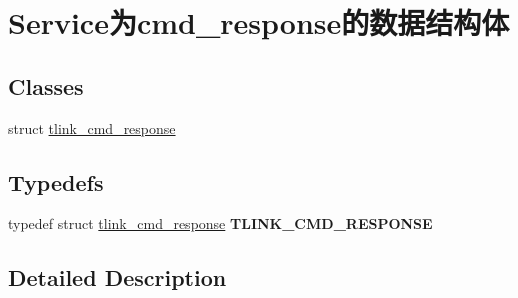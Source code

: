 \hypertarget{group__service_xE4_xB8_xBAcmd__response_xE7_x9A_x84_xE6_x95_xB0_xE6_x8D_xAE_xE7_xBB_x93_xE6_x9E_x84_xE4_xBD_x93}{}\section{Service为cmd\+\_\+response的数据结构体}
\label{group__service_xE4_xB8_xBAcmd__response_xE7_x9A_x84_xE6_x95_xB0_xE6_x8D_xAE_xE7_xBB_x93_xE6_x9E_x84_xE4_xBD_x93}
\subsection*{Classes}
\begin{DoxyCompactItemize}
\item 
struct \mbox{\hyperlink{structtlink__cmd__response}{tlink\+\_\+cmd\+\_\+response}}
\end{DoxyCompactItemize}
\subsection*{Typedefs}
\begin{DoxyCompactItemize}
\item 
\mbox{\label{group__service_xE4_xB8_xBAcmd__response_xE7_x9A_x84_xE6_x95_xB0_xE6_x8D_xAE_xE7_xBB_x93_xE6_x9E_x84_xE4_xBD_x93_gadbaf70edf505b48d7bd680a3763b32e1}} 
typedef struct \mbox{\hyperlink{structtlink__cmd__response}{tlink\+\_\+cmd\+\_\+response}} {\bfseries T\+L\+I\+N\+K\+\_\+\+C\+M\+D\+\_\+\+R\+E\+S\+P\+O\+N\+SE}
\end{DoxyCompactItemize}


\subsection{Detailed Description}
